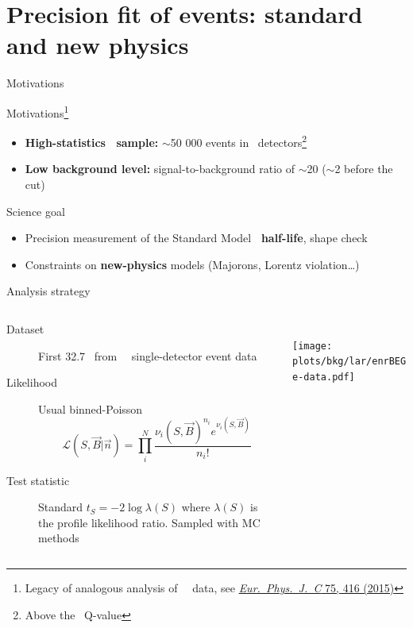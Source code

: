 \documentclass[10pt,aspectratio=169]{beamer}
\begin{document}
\section{Precision fit of \texorpdfstring{\nnbb}{2nubb} events: standard and new physics}
\begin{frame}{Motivations}
  \begin{exampleblock}{Motivations\footnote{Legacy of analogous analysis of \gerda\ \phaseone\
    data, see \href{https://doi.org/10.1140/epjc/s10052-015-3627-y}{\emph{Eur.~Phys.~J.~C} 75, 416 (2015)}}}
    \begin{itemize}
      \item \textbf{High-statistics \nnbb\ sample:} $\sim$50 000 events in \bege\ detectors\footnote{Above the \Arl\ Q-value}
      \item \textbf{Low background level:} signal-to-background ratio of $\sim$20 ($\sim$2 before the cut)
    \end{itemize}
  \end{exampleblock}

  \begin{alertblock}{Science goal}
    \begin{itemize}
      \item Precision measurement of the Standard Model \textbf{\nnbb\ half-life}, shape check
      \item Constraints on \textbf{new-physics} models (Majorons, Lorentz violation\ldots)
    \end{itemize}
  \end{alertblock}
\end{frame}
\begin{frame}{Analysis strategy}
  \begin{columns}
    \hspace{-1cm}
    \begin{column}{0.6\textwidth}
      \begin{description}
        \item[Dataset] First \alert{32.7~\kgyr} from \phasetwo\ \alert{\bege\
          single-detector} event data
        \item[Likelihood] Usual binned-Poisson
          \[
            \mathcal{L}(S, \vec{B} | \vec{n}) =
            \prod_i^{N} \frac{{\nu_i(S, \vec{B})}^{n_i} e^{\nu_i(S, \vec{B})}}{n_i!}
          \]
        \item[Test statistic] Standard \alert{$t_S = -2\log\lambda(S)$} where
          $\lambda(S)$ is the \alert{profile likelihood ratio}. Sampled with MC
          methods
      \end{description}
    \end{column}
    \hspace{-2cm}
    \begin{column}{0.4\textwidth}
      \vspace*{1cm} \\
      \texttt{[image: plots/bkg/lar/enrBEGe-data.pdf]}
    \end{column}
  \end{columns}
\end{frame}
\end{document}
